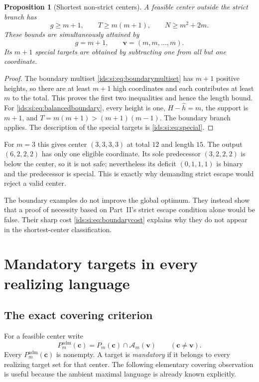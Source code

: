 \documentclass[11pt,letterpaper]{article}
\newtheorem{proposition}[theorem]{Proposition}
\theoremstyle{definition}\newtheorem{definition}[theorem]{Definition}
\theoremstyle{remark}\newtheorem{remark}[theorem]{Remark}
\theoremstyle{definition}\newtheorem{question}[theorem]{Question}
\newcommand{\Adm}[1]{\mathcal A_m(#1)}
\begin{document}
\begin{proposition}[Shortest non-strict centers]\label{ids:si:prop:boundary}
A feasible center outside the strict branch has
\begin{equation}\label{ids:si:eq:boundarycost}
 g\geq m+1,\qquad T\geq m(m+1),\qquad N\geq m^2+2m.
\end{equation}
These bounds are simultaneously attained by
\begin{equation}\label{ids:si:eq:balancedboundary}
 g=m+1,\qquad \mathbf v=(m,m,\ldots,m).
\end{equation}
Its $m+1$ special targets are obtained by subtracting one from all but one
coordinate.
\end{proposition}
\begin{proof}
The boundary multiset \eqref{ids:si:eq:boundarymultiset} has $m+1$ positive
heights, so there are at least $m+1$ high coordinates and each contributes
at least $m$ to the total. This proves the first two inequalities and hence
the length bound. For \eqref{ids:si:eq:balancedboundary}, every height is one,
$H-\hat h=m$, the support is $m+1$, and
$T=m(m+1)>(m+1)(m-1)$. The boundary branch applies. The description of the
special targets is \eqref{ids:si:eq:special}.
\end{proof}

For $m=3$ this gives center $(3,3,3,3)$ at total $12$ and length $15$.
The output $(6,2,2,2)$ has only one eligible coordinate. Its sole
predecessor $(3,2,2,2)$ is below the center, so it is not safe; nevertheless
its deficit $(0,1,1,1)$ is binary and the predecessor is special. This is
exactly why demanding strict escape would reject a valid center.

The boundary examples do not improve the global optimum. They instead
show that a proof of necessity based on Part~II's strict escape condition
alone would be false. Their sharp cost \eqref{ids:si:eq:boundarycost} explains why they
do not appear in the shortest-center classification.

\section{Mandatory targets in every realizing language}\label{ids:si:sec:mandatory}

\subsection{The exact covering criterion}
For a feasible center write
\[
 P^{\mathrm{adm}}_m(\mathbf c)=P_m(\mathbf c)\cap\Adm{\mathbf v}\qquad(\mathbf c\ne\mathbf v).
\]
Every $P^{\mathrm{adm}}_m(\mathbf c)$ is nonempty. A target is \emph{mandatory} if it belongs to
every realizing target set for that center. The following elementary
covering observation is useful because the ambient maximal language is
already known explicitly.
\end{document}
